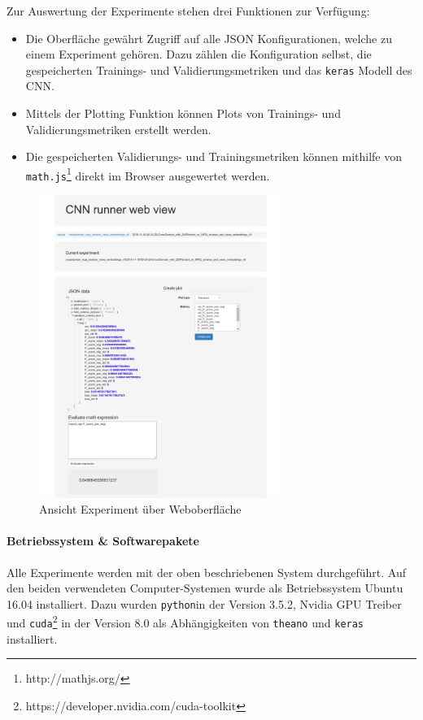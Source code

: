 Zur Auswertung der Experimente stehen drei Funktionen zur Verfügung:
\begin{itemize}
	\item Die Oberfläche gewährt Zugriff auf alle JSON Konfigurationen, welche zu einem Experiment gehören. Dazu zählen die Konfiguration selbst, die gespeicherten Trainings- und Validierungsmetriken und das \texttt{keras} Modell des CNN.
	\item Mittels der Plotting Funktion können Plots von Trainings- und Validierungsmetriken erstellt werden.
	\item Die gespeicherten Validierungs- und Trainingsmetriken können mithilfe von \texttt{math.js}\footnote{http://mathjs.org/} direkt im Browser ausgewertet werden.
\end{itemize}
\begin{figure}[H]
	\centering
	\includegraphics[width=0.7\textwidth]{img/web_gui}
	\caption{Ansicht Experiment über Weboberfläche}
	\label{fig:web_gui}
\end{figure}

\paragraph{Betriebssystem \& Softwarepakete}
\label{technical_setup:software}
Alle Experimente werden mit der oben beschriebenen System durchgeführt. Auf den beiden verwendeten Computer-Systemen wurde als Betriebssystem Ubuntu 16.04 installiert. Dazu wurden \texttt{python}in der Version 3.5.2, Nvidia GPU Treiber und \texttt{cuda}\footnote{https://developer.nvidia.com/cuda-toolkit} in der Version 8.0 als Abhängigkeiten von \texttt{theano} und \texttt{keras} installiert.

